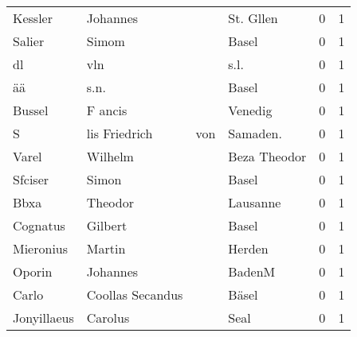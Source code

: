 \documentclass[10pt,a4paper,landscape]{article}
\begin{document}
\begin{longtable}{llllrr}
                  Kessler &                           Johannes &             &                                   St. Gllen &          0 &         1 \\
                   Salier &                              Simom &             &                                       Basel &          0 &         1 \\
                       dl &                                vln &             &                                        s.l. &          0 &         1 \\
                       ää &                               s.n. &             &                                       Basel &          0 &         1 \\
                   Bussel &                            F ancis &             &                                     Venedig &          0 &         1 \\
                        S &                      lis Friedrich &         von &                                   Samaden.  &          0 &         1 \\
                    Varel &                            Wilhelm &             &                                Beza Theodor &          0 &         1 \\
                  Sfciser &                              Simon &             &                                       Basel &          0 &         1 \\
                     Bbxa &                            Theodor &             &                                    Lausanne &          0 &         1 \\
                 Cognatus &                            Gilbert &             &                                       Basel &          0 &         1 \\
                Mieronius &                             Martin &             &                                      Herden &          0 &         1 \\
                   Oporin &                           Johannes &             &                                      BadenM &          0 &         1 \\
                    Carlo &                   Coollas Secandus &             &                                       Bäsel &          0 &         1 \\
              Jonyillaeus &                            Carolus &             &                                        Seal &          0 &         1 \\

\end{longtable}
\end{document}
